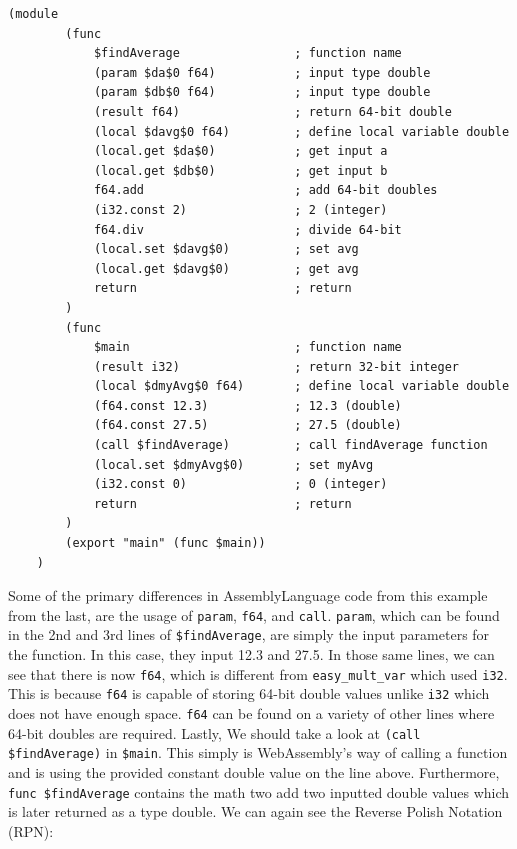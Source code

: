 \documentclass{article}
\theoremstyle{theorem}
\theoremstyle{definition}
\theoremstyle{remark}
\begin{document}
\medskip\noindent
\begin{lstlisting}[style=WasmStyle]
    (module
        (func
            $findAverage                ; function name
            (param $da$0 f64)           ; input type double
            (param $db$0 f64)           ; input type double
            (result f64)                ; return 64-bit double
            (local $davg$0 f64)         ; define local variable double
            (local.get $da$0)           ; get input a
            (local.get $db$0)           ; get input b
            f64.add                     ; add 64-bit doubles
            (i32.const 2)               ; 2 (integer)
            f64.div                     ; divide 64-bit
            (local.set $davg$0)         ; set avg
            (local.get $davg$0)         ; get avg
            return                      ; return
        )
        (func
            $main                       ; function name
            (result i32)                ; return 32-bit integer
            (local $dmyAvg$0 f64)       ; define local variable double
            (f64.const 12.3)            ; 12.3 (double)
            (f64.const 27.5)            ; 27.5 (double)
            (call $findAverage)         ; call findAverage function
            (local.set $dmyAvg$0)       ; set myAvg
            (i32.const 0)               ; 0 (integer)
            return                      ; return
        )
        (export "main" (func $main))
    )
\end{lstlisting}

\medskip\noindent
Some of the primary differences in AssemblyLanguage code from this example from the last, are the usage of \verb|param|, \verb|f64|, and \verb|call|. \verb|param|, which can be found in the 2nd and 3rd lines of \verb|$findAverage|, are simply the input parameters for the function. In this case, they input 12.3 and 27.5. In those same lines, we can see that there is now \verb|f64|, which is different from \verb|easy_mult_var| which used \verb|i32|. This is because \verb|f64| is capable of storing 64-bit double values unlike \verb|i32| which does not have enough space. \verb|f64| can be found on a variety of other lines where 64-bit doubles are required. Lastly, We should take a look at \verb|(call $findAverage)| in \verb|$main|. This simply is WebAssembly's way of calling a function and is using the provided constant double value on the line above. Furthermore, \verb|func $findAverage| contains the math two add two inputted double values which is later returned as a type double. We can again see the Reverse Polish Notation (RPN):
\end{document}
